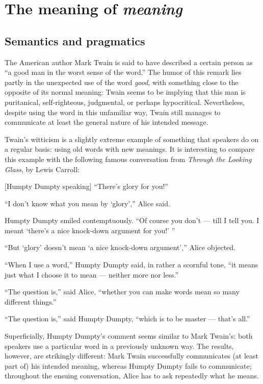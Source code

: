\chapter{The meaning of \textit{meaning}}\label{sec:1}

\section{Semantics and pragmatics}\label{sec:1.1}

The American author Mark Twain is said to have described a certain person as “a good man in the worst sense of the word.” The humor of this remark lies partly in the unexpected use of the word \textit{good}, with something close to the opposite of its normal meaning: Twain seems to be implying that this man is puritanical, self-righteous, judgmental, or perhaps hypocritical. Nevertheless, despite using the word in this unfamiliar way, Twain still manages to communicate at least the general nature of his intended message.



Twain’s witticism is a slightly extreme example of something that speakers do on a regular basis: using old words with new meanings. It is interesting to compare this example with the following famous conversation from \textit{Through the Looking Glass}, by Lewis Carroll:


\ea
{}[Humpty Dumpty speaking] “There’s glory for you!”

“I don’t know what you mean by ‘glory’,” Alice said.

Humpty Dumpty smiled contemptuously. “Of course you don’t — till I tell you. I meant ‘there’s a nice knock-down argument for you!’ ”

“But ‘glory’ doesn’t mean ‘a nice knock-down argument’,” Alice objected. 

“When I use a word,” Humpty Dumpty said, in rather a scornful tone, “it means just what I choose it to mean — neither more nor less.”

“The question is,” said Alice, “whether you can make words mean so many different things.”

“The question is,” said Humpty Dumpty, “which is to be master — that’s all.”
\z

Superficially, Humpty Dumpty’s comment seems similar to Mark Twain’s: both speakers use a particular word in a previously unknown way. The results, however, are strikingly different: Mark Twain successfully communicates (at least part of) his intended meaning, whereas Humpty Dumpty fails to communicate; throughout the ensuing conversation, Alice has to ask repeatedly what he means.



